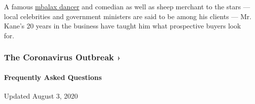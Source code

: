 A famous \href{https://www.youtube.com/watch?v=SfeOEF8zvcs}{mbalax
dancer} and comedian as well as sheep merchant to the stars --- local
celebrities and government ministers are said to be among his clients
--- Mr. Kane's 20 years in the business have taught him what prospective
buyers look for.

\href{https://www.nytimes.com/news-event/coronavirus?action=click\&pgtype=Article\&state=default\&region=MAIN_CONTENT_3\&context=storylines_faq}{}

\hypertarget{the-coronavirus-outbreak-}{%
\subsubsection{The Coronavirus Outbreak
›}\label{the-coronavirus-outbreak-}}

\hypertarget{frequently-asked-questions}{%
\paragraph{Frequently Asked
Questions}\label{frequently-asked-questions}}

Updated August 3, 2020


